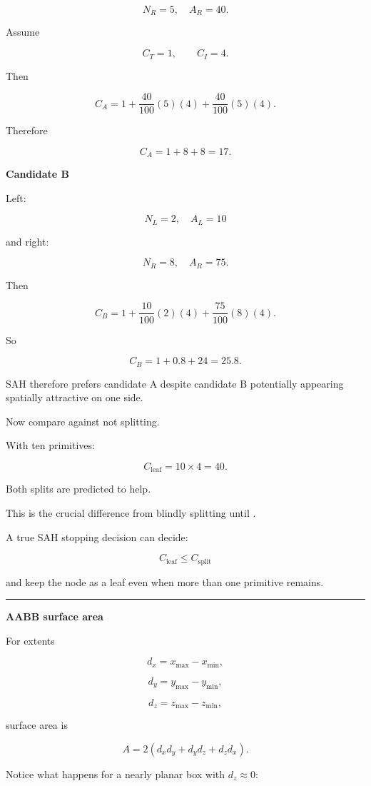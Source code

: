 \[
N_R=5,\quad A_R=40.
\]

Assume

\[
C_T=1,
\qquad
C_I=4.
\]

Then

\[
C_A
=
1+
\frac{40}{100}(5)(4)
+
\frac{40}{100}(5)(4).
\]

Therefore

\[
C_A=1+8+8=17.
\]

\textbf{Candidate B}

Left:

\[
N_L=2,\quad A_L=10
\]

and right:

\[
N_R=8,\quad A_R=75.
\]

Then

\[
C_B
=
1+
\frac{10}{100}(2)(4)
+
\frac{75}{100}(8)(4).
\]

So

\[
C_B=1+0.8+24=25.8.
\]

SAH therefore prefers candidate A despite candidate B potentially appearing spatially attractive on one side.

Now compare against not splitting.

With ten primitives:

\[
C_{\text{leaf}}
=
10\times4
=
40.
\]

Both splits are predicted to help.

This is the crucial difference from blindly splitting until .

A true SAH stopping decision can decide:

\[
C_{\text{leaf}}
\le C_{\text{split}}
\]

and keep the node as a leaf even when more than one primitive remains.

\begin{center}\rule{0.5\linewidth}{0.5pt}\end{center}

\textbf{AABB surface area}

For extents

\[
d_x=x_{\max}-x_{\min},
\]

\[
d_y=y_{\max}-y_{\min},
\]

\[
d_z=z_{\max}-z_{\min},
\]

surface area is

\[
\boxed{
A=2(d_xd_y+d_yd_z+d_zd_x).
}
\]

Notice what happens for a nearly planar box with \(d_z\approx0\):

